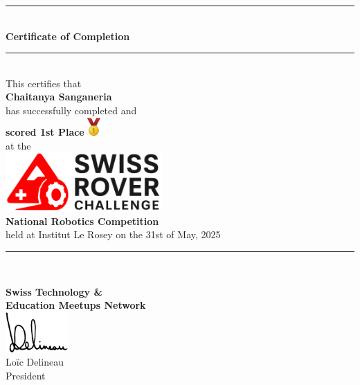 \documentclass[10pt]{article}
\begin{document}
\begin{center}
	\rule{10cm}{0.4pt} \\
	\vspace{1cm}
	{\LARGE \bfseries Certificate of Completion} \\
	\vspace{0.5cm}
	\rule{10cm}{0.4pt} \\
	\vspace{1.5cm}
	{\large This certifies that} \\
	\vspace{1cm}
	{\Huge \bfseries Chaitanya Sanganeria} \\
	\vspace{1cm}
	{\large has successfully completed and} \\
	\vspace{0.8cm}
	{\LARGE \bfseries scored 1st Place}
	\includegraphics[width=0.5cm]{gold.png} \\
	\vspace{1cm}
	{\large at the} \\
	\vspace{1cm}
	\includegraphics[width=6cm]{src.png} \\
	\vspace{1cm}
	{\LARGE \bfseries National Robotics Competition} \\
	\vspace{1cm}
	{\large held at Institut Le Rosey on the 31st of May, 2025} \\
	\vspace{1cm}
	\rule{10cm}{0.4pt} \\
\end{center}

\begin{flushright}
\end{flushright}

\vfill

\begin{center}
	\textbf{Swiss Technology \&} \\
	\textbf{Education Meetups Network} \\
	\vspace{0.3cm}
	\includegraphics[width=2.4cm]{signature-tight.png} \\
	Loïc Delineau \\
	President \\
\end{center}
\end{document}
